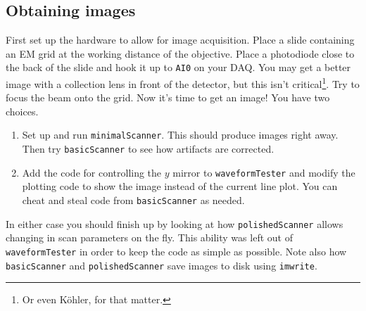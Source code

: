 \documentclass[a4paper]{report}
\begin{document}
\subsection{Obtaining images}
First set up the hardware to allow for image acquisition.
Place a slide containing an EM grid at the working distance of the objective. 
Place a photodiode close to the back of the slide and hook it up to \texttt{AI0} on your DAQ. 
You may get a better image with a collection lens in front of the detector, but this isn't critical\footnote{Or even K\"{o}hler, for that matter.}.
Try to focus the beam onto the grid.
Now it's time to get an image!
You have two choices.
\begin{enumerate}
    \item Set up and run \texttt{minimalScanner}. This should produce images right away. Then try \texttt{basicScanner} to see how artifacts are corrected.
    \item Add the code for controlling the $y$ mirror to \texttt{waveformTester} and modify the plotting code to show the image instead of the current line plot. 
    You can cheat and steal code from \texttt{basicScanner} as needed. 
\end{enumerate}

In either case you should finish up by looking at how \texttt{polishedScanner} allows changing in scan parameters on the fly. 
This ability was left out of \texttt{waveformTester} in order to keep the code as simple as possible.
Note also how \texttt{basicScanner} and \texttt{polishedScanner} save images to disk using \texttt{imwrite}.
\end{document}
